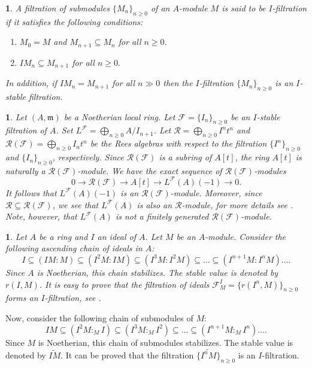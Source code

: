 \documentclass[11pt]{amsart}
\theoremstyle{plain}
\newtheorem{point}[theorem]{}
\newcommand{\m}{\mathfrak{m}}
\newcommand{\R}{\mathcal{R}}
\newcommand{\F}{\mathcal{F}}
\theoremstyle{plain}
\begin{document}
\begin{point}
    \normalfont
    A filtration of submodules $\{M_n\}_{n\geq 0}$ of an $A$-module $M$ is said to be $I$-filtration if it satisfies the following conditions:
    \begin{enumerate}
        \item $M_0=M$ and $M_{n+1}\subseteq M_n$ for all $n\geq 0$.
        \item $IM_n\subseteq M_{n+1}$ for all $n\geq 0.$

    \end{enumerate}
In addition, if $IM_n=M_{n+1}$ for all $n\gg0$ then the $I$-filtration $\{M_n\}_{n\geq 0}$ is an $I$-stable filtration.
\end{point}
\begin{point}
\normalfont
 Let $(A,\m)$ be a Noetherian local ring. Let $\F = \{I_n\}_{n\geq 0}$ be an $I$-stable filtration of $A$. Set ${L}^{\F}=\bigoplus_{n\geq 0}A/{I_{n+1}}$. Let $\R=\bigoplus_{n\geq 0}{I^n}t^n$ and  ${\R}(\F)=\bigoplus_{n\geq 0}{I_n}t^n$ be the Rees algebras with respect to the filtration $\{I^n\}_{n\geq 0}$ and $\{I_n\}_{n\geq 0}$, respectively. Since ${\R}(\F)$ is a subring of $A[t]$, the ring $A[t]$ is naturally a ${\R}(\F)$-module. We have the exact sequence of $\R(\F)$-modules $$0\to {\R}(\F)\to A[t]\to {L}^{\F}(A)(-1)\to 0 .$$ It follows that  ${L}^{\F}(A)(-1)$ is an $\R(\F)$-module. Moreover, since $\R\subseteq \R(\F)$, we see that ${L}^{\F}(A)$ is also an $\R$-module, for more details see \cite[4.2]{Part1}.
 Note, however, that $L^\F(A)$ is \emph{not} a finitely generated $\R(\F)$-module.
\end{point}

\begin{point}
\normalfont
Let $A$ be a ring and $I$ an ideal of $A$. Let $M$ be an $A$-module. Consider the following ascending chain of ideals in $A$: $$I\subseteq (IM:M)\subseteq (I^2M:IM)\subseteq (I^3M:I^2M)\subseteq \ldots \subseteq(I^{n+1}M:I^nM) \ldots .$$ Since $A$ is Noetherian, this chain stabilizes. The stable value is denoted by $r(I, M)$. It is easy to prove that the filtration of ideals $\mathcal{F}^I_M=\{r(I^n, M)\}_{n\geq 0}$ forms an $I$-filtration, see \cite[Theorem 2.1]{Zulfeqarr}.
\end{point}


Now, consider the following chain of submodules of $M$: $$IM\subseteq (I^2M:_MI)\subseteq (I^3M:_MI^2)\subseteq \ldots \subseteq (I^{n+1}M:_MI^n) \ldots .$$ Since $M$ is Noetherian, this chain of submodules stabilizes. The stable value is denoted by $\widetilde{IM}$. It can be proved that the filtration $\{\widetilde{I^nM}\}_{n\geq 0}$ is an $I$-filtration.
\end{document}
